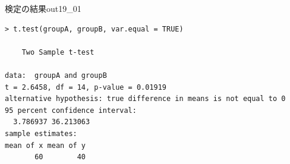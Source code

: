 \begin{Rscreen}{検定の結果}{out19_01}
	\begin{verbatim}
> t.test(groupA, groupB, var.equal = TRUE)

	Two Sample t-test

data:  groupA and groupB
t = 2.6458, df = 14, p-value = 0.01919
alternative hypothesis: true difference in means is not equal to 0
95 percent confidence interval:
  3.786937 36.213063
sample estimates:
mean of x mean of y 
       60        40 
\end{verbatim}
\end{Rscreen}
